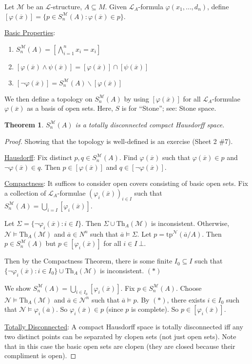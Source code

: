 \documentclass[]{article}
\theoremstyle{custhm}
\newtheorem{theorem}{Theorem}[section]
\theoremstyle{cusdef}
\theoremstyle{custhm}
\theoremstyle{custhm}
\theoremstyle{custhm}
\theoremstyle{ex}
\theoremstyle{custhm}
\theoremstyle{cusdef}
\theoremstyle{remark}
\theoremstyle{remark}
\theoremstyle{numremark}
\renewcommand{\L}{\mathcal{L}}
\newcommand{\M}{\mathcal{M}}
\renewcommand{\phi}{\varphi}
\renewcommand{\bar}{\overline}
\newcommand{\Th}{\textrm{Th}}
\newcommand{\tp}{\textrm{tp}}
\newcommand{\false}{\bot}
\newcommand{\N}{\mathcal{N}}
\newcommand{\sman}{S_n^\M(A)}
\renewcommand{\subset}{\subseteq}
\begin{document}
Let $\M$ be an $\L$-structure, $A\subset M$. Given $\L_A$-formula $\phi(x_1,\dots,d_n)$, define $[\phi(\bar{x})] = \{p \in S_n^\M(A):\phi(\bar{x}) \in p\}$.

\underline{Basic Properties}:
\begin{enumerate}[label = \arabic*.]
	\item $\sman = \left[\bigwedge_{i=1}^{n}x_i = x_i\right]$
	\item $\left[\phi(\bar{x})\land\psi(\bar{x})\right] = [\phi(\bar{x})]\cap [\psi(\bar{x})]$
	\item $\left[\neg \phi(\bar{x})\right] = \sman\backslash \left[\phi(\bar{x})\right]$
\end{enumerate}
We then define a topology on $\sman$ by using $[\phi(\bar{x})]$ for all $\L_A$-formulae $\phi(\bar{x})$ as a basis of open sets. Here, $S$ is for ``Stone''; see: Stone space.

\begin{theorem}
$\sman$ is a totally disconnected compact Hausdorff space.
\end{theorem}
\begin{proof}
Showing that the topology is well-defined is an exercise (Sheet 2 \#7).

\underline{Hausdorff}: Fix distinct $p,q \in \sman$. Find $\phi(\bar{x})$ such that $\phi(\bar{x}) \in p$ and $\neg\phi(\bar{x}) \in q$. Then $p \in [\phi(\bar{x})]$ and $q \in [\neg \phi(\bar{x})]$.

\underline{Compactness}: It suffices to consider open covers consisting of basic open sets. Fix a collection of $\L_A$-formulae $(\phi_i(\bar{x}))_{i\in I}$ such that $\sman = \bigcup_{i=I}\left[\phi_i(\bar{x})\right]$.

Let $\Sigma = \{\neg \phi_i(\bar{x}):i\in I\}$. Then $\Sigma \cup \Th_A(\M)$ is inconsistent. Otherwise, $\N\models \Th_A(\M)$ and $\bar{a}\in N^n$ such that $\bar{a} \models \Sigma$. Let $p = \tp^\N(\bar{a}/A)$. Then $p \in \sman$ but $p \in [\phi_i(\bar{x})]$ for all $i \in I\ \false$.

Then by the Compactness Theorem, there is some finite $I_0 \subset I$ such that $\{\neg \phi_i(\bar{x}):i\in I_0\}\cup\Th_A(\M)$ is inconsistent. $(\ast)$

We show $\sman = \bigcup_{i\in I_0}[\phi_i(\bar{x})]$. Fix $p \in \sman$. Choose $\N\models \Th_A(\M)$ and $\bar{a} \in \N^n$ such that $\bar{a}\models p$. By $(\ast)$, there exists $i \in I_0$ such that $\N\models \phi_i(\bar{a})$. So $\phi_i(\bar{x})\in p$ (since $p$ is complete). So $p \in [\phi_i(\bar{x})]$.

\underline{Totally Disconnected}: A compact Hausdorff space is totally disconnected iff any two distinct  points can be separated by clopen sets (not just open sets). Note that in this case the basic open sets are clopen (they are closed because their compliment is open).
\end{proof}
\end{document}
